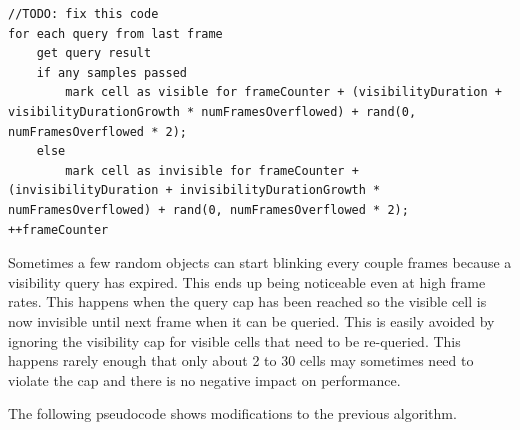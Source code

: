 \documentclass[12pt]{ucthesis}
\begin{document}
\begin{lstlisting}
//TODO: fix this code
for each query from last frame
	get query result
	if any samples passed
		mark cell as visible for frameCounter + (visibilityDuration + visibilityDurationGrowth * numFramesOverflowed) + rand(0, numFramesOverflowed * 2);
	else
		mark cell as invisible for frameCounter + (invisibilityDuration + invisibilityDurationGrowth * numFramesOverflowed) + rand(0, numFramesOverflowed * 2);
++frameCounter
\end{lstlisting}

Sometimes a few random objects can start blinking every couple frames because a visibility query has expired.
This ends up being noticeable even at high frame rates.
This happens when the query cap has been reached so the visible cell is now invisible until next frame when it can be queried.
This is easily avoided by ignoring the visibility cap for visible cells that need to be re-queried.
This happens rarely enough that only about 2 to 30 cells may sometimes need to violate the cap and there is no negative impact on performance.

The following pseudocode shows modifications to the previous algorithm.
\end{document}
